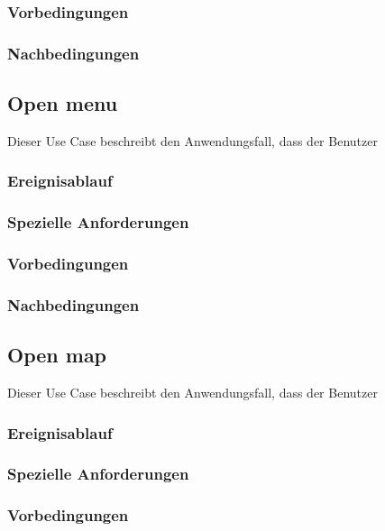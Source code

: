 		\subsubsection{Vorbedingungen}
			
		\subsubsection{Nachbedingungen}
	
	\subsection{Open menu}
		Dieser Use Case beschreibt den Anwendungsfall, dass der Benutzer 
			
		\subsubsection{Ereignisablauf}
			
		\subsubsection{Spezielle Anforderungen}		
			
		\subsubsection{Vorbedingungen}
			
		\subsubsection{Nachbedingungen}
	
	\subsection{Open map}
		Dieser Use Case beschreibt den Anwendungsfall, dass der Benutzer 
			
		\subsubsection{Ereignisablauf}
			
		\subsubsection{Spezielle Anforderungen}		
			
		\subsubsection{Vorbedingungen}
			
